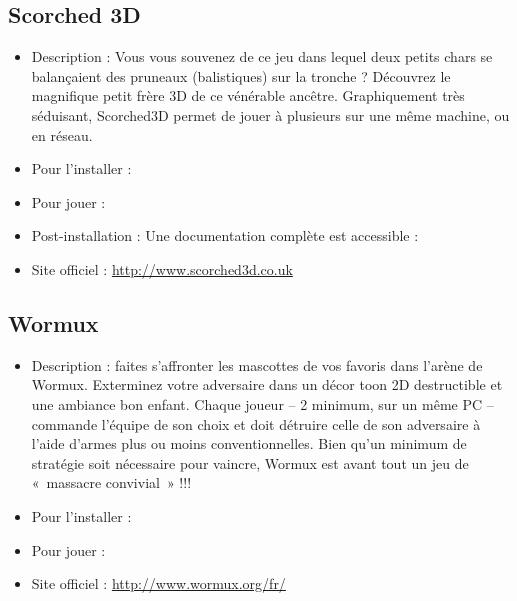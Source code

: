 \subsection{Scorched 3D}
\begin{itemize}
\begingroup
{}
\item Description : Vous vous souvenez de ce jeu dans lequel deux petits chars se balançaient des pruneaux (balistiques) sur la tronche ? Découvrez le magnifique petit frère 3D de ce vénérable ancêtre. Graphiquement très séduisant, Scorched3D permet de jouer à plusieurs sur une même machine, ou en réseau.{\par}
\endgroup
\item Pour l'installer : 
\item Pour jouer : 
\item Post-installation : Une documentation complète est accessible : 
\item Site officiel : \url{http://www.scorched3d.co.uk}{\par}
\end{itemize}
\subsection{Wormux}
\begin{itemize}
\begingroup
{}
\item Description : faites s'affronter les mascottes de vos  favoris dans l'arène de Wormux. Exterminez votre adversaire dans un décor toon 2D destructible et une ambiance bon enfant. Chaque joueur -- 2 minimum, sur un même PC -- commande l'équipe de son choix et doit détruire celle de son adversaire à l'aide d'armes plus ou moins conventionnelles. Bien qu'un minimum de stratégie soit nécessaire pour vaincre, Wormux est avant tout un jeu de «~massacre convivial~» !!!{\par}
\item Pour l'installer : 
\item Pour jouer : 
\item Site officiel : \url{http://www.wormux.org/fr/}{\par}
\endgroup
\end{itemize}
\newpage
